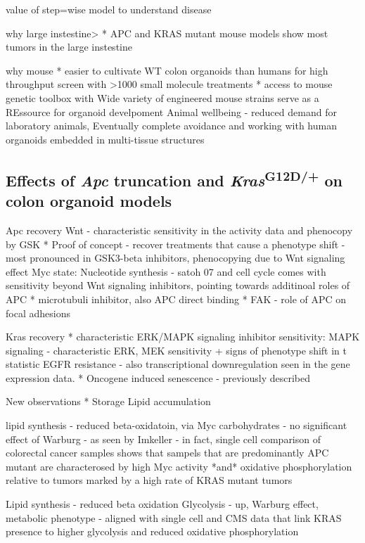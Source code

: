 \begin{flushleft}
value of step=wise model to understand disease

why large instestine>
* APC and KRAS mutant mouse models show most tumors in the large instestine \citep{luoMutatedRasAsp122009}

why mouse
* easier to cultivate WT colon organoids than humans for high throughput screen with >1000 small molecule treatments
* access to mouse genetic toolbox with Wide variety of engineered mouse strains serve as a REssource for organoid develpoment
Animal wellbeing - reduced demand for laboratory animals, Eventually complete avoidance and working with human organoids embedded in multi-tissue structures

\subsection{Effects of \textit{Apc} truncation and \textit{Kras}\textsuperscript{G12D/+} on colon organoid models}

Apc recovery 
Wnt - characteristic sensitivity in the activity data and phenocopy by GSK * Proof of concept - recover treatments that cause a phenotype shift - most pronounced in GSK3-beta inhibitors, phenocopying due to Wnt signaling effect
Myc state:
Nucleotide synthesis - satoh 07 and cell cycle
comes with sensitivity beyond Wnt signaling inhibitors, pointing towards additinoal roles of APC
* microtubuli inhibitor, also APC direct binding
* FAK - role of APC on focal adhesions
\par

Kras recovery
* characteristic ERK/MAPK signaling inhibitor sensitivity:
MAPK signaling - characteristic ERK, MEK sensitivity + signs of phenotype shift in t statistic
EGFR resistance - also transcriptional downregulation seen in the gene expression data.
* Oncogene induced senescence - previously described
\par


New observations 
* Storage Lipid accumulation

lipid synthesis - reduced beta-oxidatoin, via Myc
carbohydrates - no significant effect of Warburg - as seen by Imkeller  - in fact, single cell comparison of colorectal cancer samples shows that sampels that are predominantly APC mutant are characterosed by high Myc activity *and* oxidative phosphorylation relative to tumors marked by a high rate of KRAS mutant tumors

Lipid synthesis - reduced beta oxidation
Glycolysis - up, Warburg effect, metabolic phenotype - aligned with single cell and CMS data that link KRAS presence to higher glycolysis and reduced oxidative phosphorylation 



\end{flushleft}
